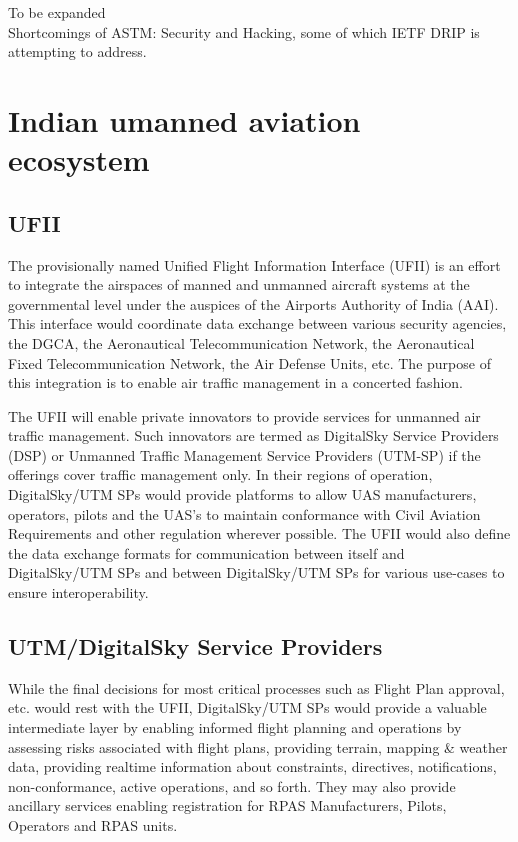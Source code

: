 \documentclass{ua_wgs_base}
\begin{document}
\begin{lyxgreyedout}
To be expanded \\
Shortcomings of ASTM: Security and Hacking, some of which IETF DRIP is attempting to address.
\end{lyxgreyedout}


\section{Indian umanned aviation ecosystem
\label{subsec:ua-ecosystem}}


\subsection{UFII}

The provisionally named Unified Flight Information Interface (UFII)
is an effort to integrate the airspaces of manned and unmanned aircraft
systems at the governmental level under the auspices of the Airports
Authority of India (AAI).
This interface would coordinate data exchange between various security
agencies, the DGCA, the Aeronautical Telecommunication Network, the
Aeronautical Fixed Telecommunication Network, the Air Defense Units,
etc. The purpose of this integration is to enable air traffic management
in a concerted fashion.

The UFII will enable private innovators to provide services for unmanned
air traffic management. Such innovators are termed as DigitalSky Service Providers (DSP) 
or Unmanned Traffic Management Service Providers (UTM-SP) if the offerings 
cover traffic management only. In their regions of operation, DigitalSky/UTM SPs 
would provide platforms to allow UAS manufacturers, operators, pilots
and the UAS\textquoteright s to maintain conformance
with Civil Aviation Requirements and other regulation wherever possible. The
UFII would also define the data exchange formats for communication
between itself and DigitalSky/UTM SPs and between DigitalSky/UTM SPs for various use-cases
to ensure interoperability.

\subsection{UTM/DigitalSky Service Providers}

While the final decisions for most critical processes such as Flight
Plan approval, etc. would rest with the UFII, DigitalSky/UTM SPs would provide
a valuable intermediate layer by enabling informed flight planning
and operations by assessing risks associated with flight plans, providing
terrain, mapping \& weather data, providing realtime information about
constraints, directives, notifications, non-conformance, active operations,
and so forth. They may also provide ancillary services enabling registration
for RPAS Manufacturers, Pilots, Operators and RPAS units.
\end{document}
